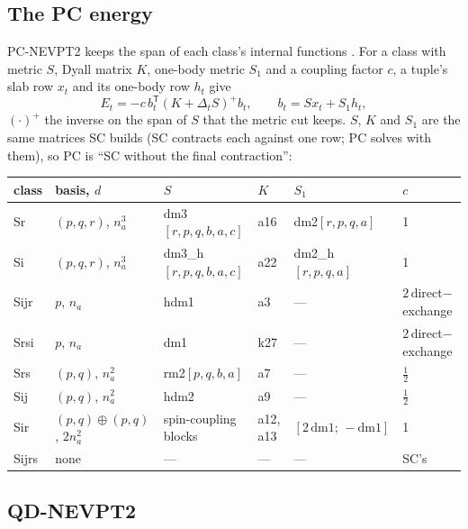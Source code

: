 \documentclass[11pt]{article}
\newcommand{\T}{\mathsf T}
\begin{document}
\subsection{The PC energy}

PC-NEVPT2 keeps the span of each class's internal functions
\cite{angeli2002}. For a class with metric $S$, Dyall matrix $K$, one-body
metric $S_1$ and a coupling factor $c$, a tuple's slab row $x_t$ and its
one-body row $h_t$ give
\begin{equation}
  E_t = -c\, b_t^\T (K + \Delta_t S)^{+} b_t,\qquad
  b_t = S x_t + S_1 h_t,
  \label{eq:pc}
\end{equation}
$(\cdot)^+$ the inverse on the span of $S$ that the metric cut keeps. $S$,
$K$ and $S_1$ are the same matrices SC builds (SC contracts each against one
row; PC solves with them), so PC is ``SC without the final contraction'':

\begin{center}
\small
\begin{tabular}{@{}llllll@{}}
\toprule
class & basis, $d$ & $S$ & $K$ & $S_1$ & $c$ \\
\midrule
Sr   & $(p,q,r)$, $n_a^3$ & dm3$[r,p,q,b,a,c]$ & a16 & dm2$[r,p,q,a]$ & 1 \\
Si   & $(p,q,r)$, $n_a^3$ & dm3\_h$[r,p,q,b,a,c]$ & a22 & dm2\_h$[r,p,q,a]$ & 1 \\
Sijr & $p$, $n_a$ & hdm1 & a3 & --- & $2\,$direct$-$exchange \\
Srsi & $p$, $n_a$ & dm1 & k27 & --- & $2\,$direct$-$exchange \\
Srs  & $(p,q)$, $n_a^2$ & rm2$[p,q,b,a]$ & a7 & --- & $\tfrac12$ \\
Sij  & $(p,q)$, $n_a^2$ & hdm2 & a9 & --- & $\tfrac12$ \\
Sir  & $(p,q)\oplus(p,q)$, $2n_a^2$ & spin-coupling blocks & a12, a13 & $[2\,\mathrm{dm1};\,-\mathrm{dm1}]$ & 1 \\
Sijrs & none & --- & --- & --- & SC's \\
\bottomrule
\end{tabular}
\end{center}

\subsection{QD-NEVPT2}
\end{document}
